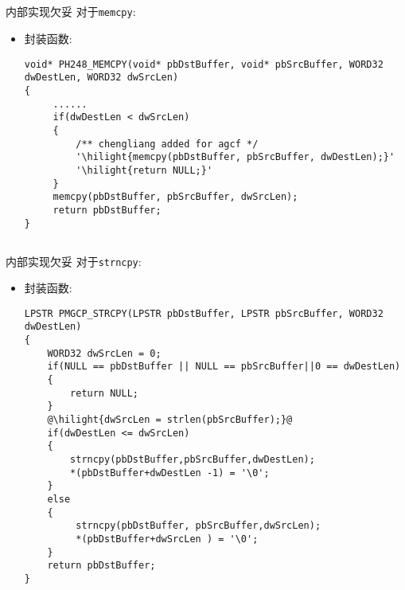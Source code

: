 ﻿\documentclass[hyperref={bookmarks=ture}xcolor=pdflatex,svgnames,table,compress]{beamer}
\begin{document}
\subsection{}
\begin{frame}[containsverbatim]{内部实现欠妥}
对于\lstinline{memcpy}:

\begin{itemize}
    \item 封装函数:
\begin{lstlisting}[basicstyle=\ttfamily\scriptsize]
void* PH248_MEMCPY(void* pbDstBuffer, void* pbSrcBuffer, WORD32 dwDestLen, WORD32 dwSrcLen)
{
     ......
     if(dwDestLen < dwSrcLen)
     {
         /** chengliang added for agcf */
         '\hilight{memcpy(pbDstBuffer, pbSrcBuffer, dwDestLen);}'
         '\hilight{return NULL;}'
     }
     memcpy(pbDstBuffer, pbSrcBuffer, dwSrcLen);
     return pbDstBuffer;
}
\end{lstlisting}
\end{itemize}
\end{frame}

\subsection{}
\begin{frame}[containsverbatim]{内部实现欠妥}
对于\lstinline{strncpy}:

\begin{itemize}
    \item 封装函数:
\begin{lstlisting}[basicstyle=\ttfamily\tiny,escapechar=@]
LPSTR PMGCP_STRCPY(LPSTR pbDstBuffer, LPSTR pbSrcBuffer, WORD32 dwDestLen)
{
    WORD32 dwSrcLen = 0;
    if(NULL == pbDstBuffer || NULL == pbSrcBuffer||0 == dwDestLen)
    {
        return NULL;
    }
    @\hilight{dwSrcLen = strlen(pbSrcBuffer);}@
    if(dwDestLen <= dwSrcLen)
    {
        strncpy(pbDstBuffer,pbSrcBuffer,dwDestLen);
        *(pbDstBuffer+dwDestLen -1) = '\0';
    }
    else
    {
         strncpy(pbDstBuffer, pbSrcBuffer,dwSrcLen);
         *(pbDstBuffer+dwSrcLen ) = '\0';
    }
    return pbDstBuffer;
}
\end{lstlisting}
\end{itemize}
\end{frame}
\end{document}
